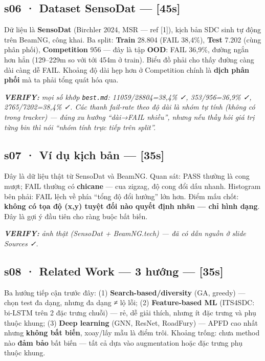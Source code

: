 \documentclass[
  11pt,
]{article}
\renewenvironment{quote}
  {\par\smallskip\noindent
   \def\FrameCommand{{\color{deckorange}\vrule width 2.5pt}\hspace{10pt}}%
   \MakeFramed{\advance\hsize-\width\FrameRestore}%
   \footnotesize\itshape\color{deckslate}}
  {\par\endMakeFramed\smallskip}
\begin{document}
\subsection{s06 · Dataset SensoDat ---
{[}45s{]}}\label{s06-dataset-sensodat-45s}

Dữ liệu là \textbf{SensoDat} (Birchler 2024, MSR --- ref {[}1{]}), kịch
bản SDC sinh tự động trên BeamNG, công khai. Ba split: \textbf{Train}
28.804 (FAIL 38,4\%), \textbf{Test} 7.202 (cùng phân phối),
\textbf{Competition} 956 --- đây là tập \textbf{OOD}: FAIL 36,9\%, đường
ngắn hơn hẳn (129--229m so với tới 454m ở train). Biểu đồ phải cho thấy
đường càng dài càng dễ FAIL. Khoảng độ dài hẹp hơn ở Competition chính
là \textbf{dịch phân phối} mà ta phải tổng quát hóa qua.

\begin{quote}
\textbf{VERIFY:} mọi số khớp \texttt{best.md}: 11059/28804=38,4\% ✓,
353/956=36,9\% ✓, 2765/7202=38,4\% ✓. Các thanh fail-rate theo độ dài là
nhóm tự tính (không có trong tracker) --- đúng xu hướng ``dài→FAIL
nhiều'', nhưng nếu thầy hỏi giá trị từng bin thì nói ``nhóm tính trực
tiếp trên split''.
\end{quote}

\subsection{s07 · Ví dụ kịch bản ---
{[}35s{]}}\label{s07-vuxed-dux1ee5-kux1ecbch-bux1ea3n-35s}

Đây là dữ liệu thật từ SensoDat và BeamNG. Quan sát: PASS thường là cong
mượt; FAIL thường có \textbf{chicane} --- cua zigzag, độ cong đổi dấu
nhanh. Histogram bên phải: FAIL lệch về phía ``tổng độ đổi hướng'' lớn
hơn. Điểm mấu chốt: \textbf{không có tọa độ (x,y) tuyệt đối nào quyết
định nhãn --- chỉ hình dạng}. Đây là gợi ý đầu tiên cho ràng buộc bất
biến.

\begin{quote}
\textbf{VERIFY:} ảnh thật (SensoDat + BeamNG.tech) --- đã có dẫn nguồn ở
slide Sources ✓.
\end{quote}

\subsection{s08 · Related Work --- 3 hướng ---
{[}35s{]}}\label{s08-related-work-3-hux1b0ux1edbng-35s}

Ba hướng tiếp cận trước đây: (1) \textbf{Search-based/diversity} (GA,
greedy) --- chọn test đa dạng, nhưng đa dạng ≠ lộ lỗi; (2)
\textbf{Feature-based ML} (ITS4SDC: bi-LSTM trên 2 đặc trưng chuỗi) ---
rẻ, dễ giải thích, nhưng ít đặc trưng và phụ thuộc khung; (3)
\textbf{Deep learning} (GNN, ResNet, RoadFury) --- APFD cao nhất nhưng
\textbf{không bất biến}, xoay/lấy mẫu là điểm trôi. Khoảng trống: chưa
method nào \textbf{đảm bảo} bất biến --- tất cả dựa vào augmentation
hoặc đặc trưng phụ thuộc khung.
\end{document}
